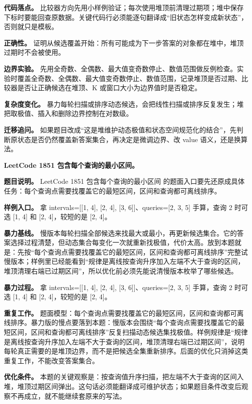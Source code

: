 \textbf{代码落点。} 比较器方向先用小样例验证；每次使用堆顶前清理过期项；堆中保存下标时要能回查原数据。关键代码行必须能逐句翻译成“旧状态怎样变成新状态”，否则就只是模板。

\textbf{正确性。} 证明从候选覆盖开始：所有可能成为下一步答案的对象都在堆中，堆顶过期时不会被使用。

\textbf{边界实验。} 先用全奇数、全偶数、最大值变奇数停止、数值范围做反例检查。实验时覆盖全奇数、全偶数、最大值变奇数停止、数值范围，记录堆顶是否过期、比较器是否让正确候选在堆顶、K 或窗口大小为边界值时是否稳定。

\textbf{复杂度变化。} 暴力每轮扫描或排序动态候选，会把线性扫描或排序反复发生；堆把取极值、插入和删除边界控制在对数级。

\textbf{迁移追问。} 如果题目改成“这是堆维护动态极值和状态空间规范化的结合”，先判断原状态是否仍然覆盖新答案集合，再决定是微调边界、改 value 语义，还是换算法。

\noindent\textbf{LeetCode 1851 包含每个查询的最小区间。}

\textbf{题目说明。} LeetCode 1851 包含每个查询的最小区间 的题面入口要先还原成具体任务：每个查询点需要找覆盖它的最短区间，区间和查询都可离线排序。

\textbf{样例入口。} 拿 intervals=[[1, 4], [2, 4], [3, 6]]、queries=[2, 3, 5] 手算，查询 2 时可选 [1, 4] 和 [2, 4]，较短的是 [2, 4]。

\textbf{暴力基线。} 慢版本每轮扫描全部候选来找最大或最小，再更新候选集合。它的答案选择过程清楚，但动态集合每变化一次就重新找极值，代价太高。放到本题就是：先按“每个查询点需要找覆盖它的最短区间，区间和查询都可离线排序”完整试慢版本；样例里已经能看到“规律是离线按查询升序加入左端不大于查询的区间，堆顶清理右端已过期区间”，所以优化前必须先能说清慢版本枚举了哪些候选。

\textbf{暴力过程。} 拿 intervals=[[1, 4], [2, 4], [3, 6]]、queries=[2, 3, 5] 手算，查询 2 时可选 [1, 4] 和 [2, 4]，较短的是 [2, 4]。

\textbf{重复工作。} 题面模型：每个查询点需要找覆盖它的最短区间，区间和查询都可离线排序。暴力版的慢点要落到本题：慢版本会围绕“每个查询点需要找覆盖它的最短区间，区间和查询都可离线排序”反复扫描动态候选集找极值。样例规律是“规律是离线按查询升序加入左端不大于查询的区间，堆顶清理右端已过期区间”，说明每轮真正需要的是堆顶边界，而不是把候选全集重新排序。后面的优化只消掉这类重复工作，不能改变答案集合。

\textbf{优化条件。} 本题的关键观察是：按查询值升序扫描，把左端不大于查询的区间入堆，堆顶过期区间弹出。这句话必须能翻译成可维护状态；如果题目条件改变后观察不再成立，就不能继续套原来的写法。

